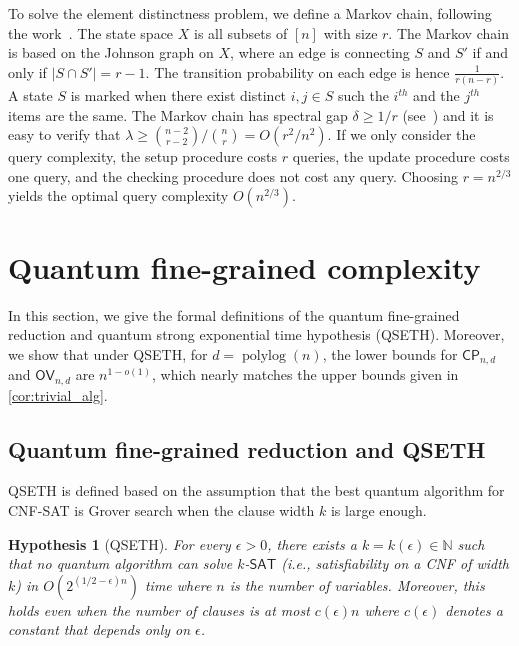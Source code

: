 \documentclass[10pt,a4paper]{article}
\newtheorem{hypothesis}[theorem]{Hypothesis}
\newcommand{\N}{\mathbb{N}}
\renewcommand{\varepsilon}{\lambda}
\DeclareMathOperator{\polylog}{polylog}
\newcommand{\CP}{\ensuremath{\mathsf{CP}}}
\newcommand{\OV}{\ensuremath{\mathsf{OV}}}
\newcommand{\SAT}{\ensuremath{\mathsf{SAT}}}
\begin{document}
To solve the element distinctness problem, we define a Markov chain, following the work~\cite{r5,r11,r28}. The state space $X$ is all subsets of $[n]$ with size $r$. The Markov chain is based on the Johnson graph on $X$, where an edge is connecting $S$ and $S'$ if and only if $|S \cap S'| = r-1$. The transition probability on each edge is hence $\frac{1}{r(n-r)}$. A state $S$ is marked when there exist distinct $i, j \in S$ such the $i^{th}$ and the $j^{th}$ items are the same. The Markov chain has spectral gap $\delta \geq 1/r$ (see~\cite{r28}) and it is easy to verify that $\varepsilon \geq \binom{n-2}{r-2}/\binom{n}{r} = O(r^2/n^2)$. If we only consider the query complexity, the setup procedure costs $r$ queries, the update procedure costs one query, and the checking procedure does not cost any query. Choosing $r = n^{2/3}$ yields the optimal query complexity $O(n^{2/3})$.



\setcounter{section}{2}
\setcounter{theorem}{22}
\section{Quantum fine-grained complexity}

In this section, we give the formal definitions of the quantum fine-grained reduction and quantum strong exponential time hypothesis (QSETH). Moreover, we show that under QSETH, for $d=\polylog(n)$, the lower bounds for $\CP_{n,d}$ and $\OV_{n,d}$ are $n^{1-o(1)}$, which nearly matches the upper bounds given in \cref{cor:trivial_alg}.  

\subsection{Quantum fine-grained reduction and QSETH}

QSETH is defined based on the assumption that the best quantum algorithm for \textsf{CNF-SAT} is Grover search when the clause width $k$ is large enough. 
\begin{hypothesis}[QSETH]
For every $\epsilon > 0$, there exists a $k = k(\epsilon) \in \N$ such that no quantum algorithm can solve $k$-$\SAT$ (i.e., satisfiability on a CNF of width $k$) in $O(2^{(1/2 - \epsilon)n})$ time where $n$ is the number of variables. Moreover, this holds even when the number of clauses is at most $c(\epsilon) n$ where $c(\epsilon)$ denotes a constant that depends only on $\epsilon$.
\end{hypothesis}
\end{document}
